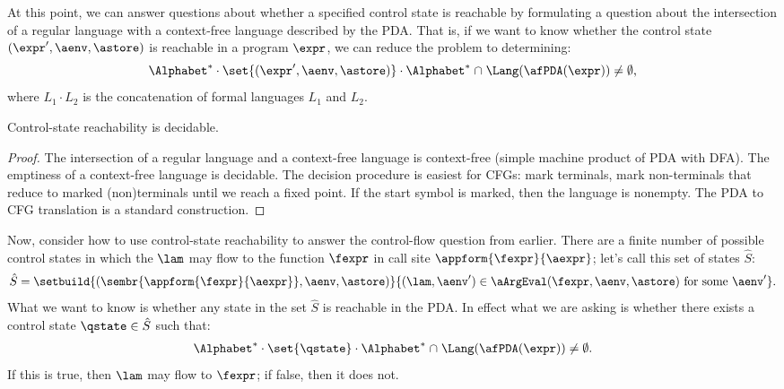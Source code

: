 At this point, we can answer questions about whether a specified
control state is reachable by formulating a question about the
intersection of a regular language with a context-free language
described by the PDA.
That is, if we want to know whether the control state
$(\expr',\aenv,\astore)$ is reachable in a program $\expr$, we can reduce the problem to determining:
\begin{equation*}
  \Alphabet^*  \cdot \set{ (\expr',\aenv,\astore) } \cdot \Alphabet^* \mathrel{\cap} \Lang(\afPDA(\expr))
  \neq \emptyset
  \text,
\end{equation*}
where $L_1 \cdot L_2$ is the concatenation of formal languages $L_1$ and $L_2$.

\begin{theorem}
  Control-state reachability is decidable.
\end{theorem}
\begin{proof}
  The intersection of a regular language and a context-free language
  is context-free (simple machine product of PDA with DFA).
The emptiness of a context-free language is decidable.
The decision procedure is easiest for CFGs: mark terminals, mark non-terminals that reduce to marked (non)terminals until we reach a fixed point. If the start symbol is marked, then the language is nonempty.
The PDA to CFG translation is a standard construction.
\end{proof}

Now, consider how to use control-state reachability to answer the
control-flow question from earlier.
There are a finite number of possible control states in which the
\lamterm{} $\lam$ may flow to the function $\fexpr$ in call site
$\appform{\fexpr}{\aexpr}$; let's call this set of states $\hat
S$:
\begin{equation*}
  \hat S = 
  \setbuild{ (\sembr{\appform{\fexpr}{\aexpr}}, \aenv, \astore) }{
    (\lam,\aenv') \in \aArgEval(\fexpr,\aenv,\astore)
    \text{ for some } \aenv'
  }
  \text.
\end{equation*}
What we want to know is whether any state in the set $\hat S$ is
reachable in the PDA.
In effect what we are asking is whether there exists a control state $\qstate \in
\hat S$ such that:
\begin{align*}
  \Alphabet^* \cdot \set{\qstate} \cdot \Alphabet^*
  \mathrel{\cap}
  \Lang(\afPDA(\expr))
  \neq 
  \emptyset
  \text.
\end{align*}
If this is true, then $\lam$ may flow to $\fexpr$; if false, then it
does not.



